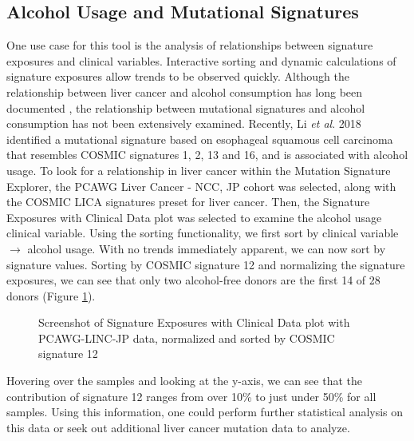 \documentclass[12pt, letterpaper]{article}
\begin{document}
\subsection{Alcohol Usage and Mutational Signatures}
One use case for this tool is the analysis of relationships between signature exposures and clinical variables.
Interactive sorting and dynamic calculations of signature exposures allow trends to be observed quickly.
Although the relationship between liver cancer and alcohol consumption has long been documented \cite{bosch2004primary}, the relationship between mutational signatures and alcohol consumption has not been extensively examined.
Recently, Li \textit{et al}. 2018 identified a mutational signature based on esophageal squamous cell carcinoma that resembles COSMIC signatures 1, 2, 13 and 16, and is associated with alcohol usage\cite{li2018mutational}.
To look for a relationship in liver cancer within the Mutation Signature Explorer, the PCAWG Liver Cancer - NCC, JP cohort was selected, along with the COSMIC LICA signatures preset for liver cancer. 
Then, the Signature Exposures with Clinical Data plot was selected to examine the alcohol usage clinical variable.
Using the sorting functionality, we first sort by clinical variable $\rightarrow$ alcohol usage.
With no trends immediately apparent, we can now sort by signature values.
Sorting by COSMIC signature 12 and normalizing the signature exposures, we can see that only two alcohol-free donors are the first 14 of 28 donors (Figure \ref{fig:caseStudy1_sig12}).
\begin{figure}[h]
    \centering
    \caption{Screenshot of Signature Exposures with Clinical Data plot with PCAWG-LINC-JP data, normalized and sorted by COSMIC signature 12}
    \label{fig:caseStudy1_sig12}
\end{figure}
Hovering over the samples and looking at the y-axis, we can see that the contribution of signature 12 ranges from over 10\% to just under 50\% for all samples.
Using this information, one could perform further statistical analysis on this data or seek out additional liver cancer mutation data to analyze.
\end{document}
